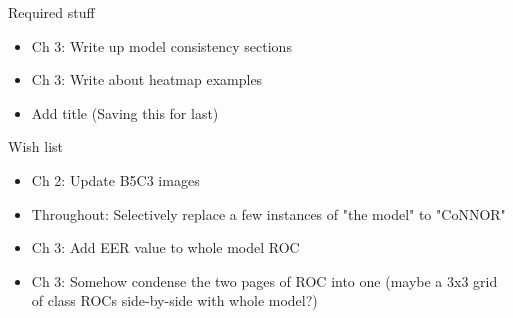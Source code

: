 
Required stuff

\begin{itemize}

\item Ch 3: Write up model consistency sections
\item Ch 3: Write about heatmap examples
\item Add title (Saving this for last)
\end{itemize}



Wish list

\begin{itemize}
\item Ch 2: Update B5C3 images
\item Throughout: Selectively replace a few instances of "the model" to "CoNNOR"
\item Ch 3: Add EER value to whole model ROC
\item Ch 3: Somehow condense the two pages of ROC into one (maybe a 3x3 grid of class ROCs side-by-side with whole model?)
\end{itemize}


